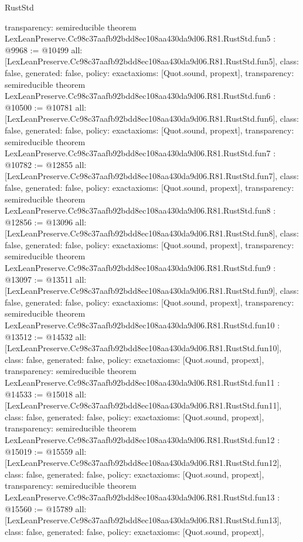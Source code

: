 \begin{lexlean}{RustStd}
\begin{coremodule}
{  transparency: semireducible
}
theorem LexLeanPreserve.Cc98c37aafb92bdd8ec108aa430da9d06.R81.RustStd.fun5 : @9968 := @10499 {
  all: [LexLeanPreserve.Cc98c37aafb92bdd8ec108aa430da9d06.R81.RustStd.fun5],
  class: false,
  generated: false,
  policy: exact{axioms: [Quot.sound, propext]},
  transparency: semireducible
}
theorem LexLeanPreserve.Cc98c37aafb92bdd8ec108aa430da9d06.R81.RustStd.fun6 : @10500 := @10781 {
  all: [LexLeanPreserve.Cc98c37aafb92bdd8ec108aa430da9d06.R81.RustStd.fun6],
  class: false,
  generated: false,
  policy: exact{axioms: [Quot.sound, propext]},
  transparency: semireducible
}
theorem LexLeanPreserve.Cc98c37aafb92bdd8ec108aa430da9d06.R81.RustStd.fun7 : @10782 := @12855 {
  all: [LexLeanPreserve.Cc98c37aafb92bdd8ec108aa430da9d06.R81.RustStd.fun7],
  class: false,
  generated: false,
  policy: exact{axioms: [Quot.sound, propext]},
  transparency: semireducible
}
theorem LexLeanPreserve.Cc98c37aafb92bdd8ec108aa430da9d06.R81.RustStd.fun8 : @12856 := @13096 {
  all: [LexLeanPreserve.Cc98c37aafb92bdd8ec108aa430da9d06.R81.RustStd.fun8],
  class: false,
  generated: false,
  policy: exact{axioms: [Quot.sound, propext]},
  transparency: semireducible
}
theorem LexLeanPreserve.Cc98c37aafb92bdd8ec108aa430da9d06.R81.RustStd.fun9 : @13097 := @13511 {
  all: [LexLeanPreserve.Cc98c37aafb92bdd8ec108aa430da9d06.R81.RustStd.fun9],
  class: false,
  generated: false,
  policy: exact{axioms: [Quot.sound, propext]},
  transparency: semireducible
}
theorem LexLeanPreserve.Cc98c37aafb92bdd8ec108aa430da9d06.R81.RustStd.fun10 : @13512 := @14532 {
  all: [LexLeanPreserve.Cc98c37aafb92bdd8ec108aa430da9d06.R81.RustStd.fun10],
  class: false,
  generated: false,
  policy: exact{axioms: [Quot.sound, propext]},
  transparency: semireducible
}
theorem LexLeanPreserve.Cc98c37aafb92bdd8ec108aa430da9d06.R81.RustStd.fun11 : @14533 := @15018 {
  all: [LexLeanPreserve.Cc98c37aafb92bdd8ec108aa430da9d06.R81.RustStd.fun11],
  class: false,
  generated: false,
  policy: exact{axioms: [Quot.sound, propext]},
  transparency: semireducible
}
theorem LexLeanPreserve.Cc98c37aafb92bdd8ec108aa430da9d06.R81.RustStd.fun12 : @15019 := @15559 {
  all: [LexLeanPreserve.Cc98c37aafb92bdd8ec108aa430da9d06.R81.RustStd.fun12],
  class: false,
  generated: false,
  policy: exact{axioms: [Quot.sound, propext]},
  transparency: semireducible
}
theorem LexLeanPreserve.Cc98c37aafb92bdd8ec108aa430da9d06.R81.RustStd.fun13 : @15560 := @15789 {
  all: [LexLeanPreserve.Cc98c37aafb92bdd8ec108aa430da9d06.R81.RustStd.fun13],
  class: false,
  generated: false,
  policy: exact{axioms: [Quot.sound, propext]},
}
\end{coremodule}
\end{lexlean}
